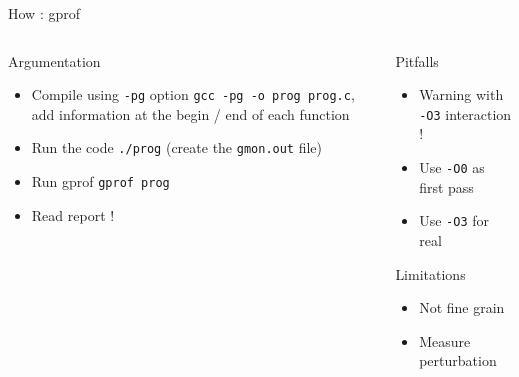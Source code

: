 %
\begin{Frame}{How : gprof}
  \begin{columns}[t]
    \begin{column}{\BW} %
      \begin{block}{Argumentation}
        \begin{itemize}
        \item Compile using \texttt{-pg} option
          \texttt{gcc -pg -o prog prog.c}, add information at the
          begin / end of each function
        \item Run the code \texttt{./prog}
          (create the \texttt{gmon.out} file)
        \item Run gprof \texttt{gprof prog}
        \item Read report !
        \end{itemize}
      \end{block} 
    \end{column}
    
    \begin{column}{\BW} %
      \begin{block}{Pitfalls}
        \begin{itemize}
        \item Warning with \texttt{-O3} interaction !
        \item Use \texttt{-O0} as first pass
        \item Use \texttt{-O3} for real
        \end{itemize}
      \end{block}   
      \begin{alertblock}{Limitations}
        \begin{itemize}
        \item Not fine grain
        \item Measure perturbation
        \end{itemize}
      \end{alertblock}
    \end{column}
  \end{columns}  
\end{Frame}


